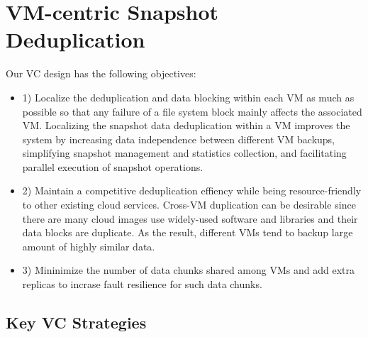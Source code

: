 \section{VM-centric Snapshot Deduplication}
\label{sect:dedupe}


Our VC design has the following objectives:
\begin{itemize}

\item
1) Localize the deduplication and data blocking within each VM as much as possible so 
that any failure of a file system block mainly affects the associated VM.
Localizing the snapshot data deduplication within a VM
improves the system by increasing data independence between different VM backups,
simplifying snapshot management and statistics collection,
and facilitating parallel execution of snapshot operations.
\item
2) Maintain a competitive deduplication effiency while being resource-friendly to other
existing cloud services.
Cross-VM duplication can be desirable since  there are many cloud images
use widely-used software and libraries and their data blocks are duplicate. 
As the result, different VMs tend to backup large amount of highly similar data.
\item
3)  Mininimize the number of data chunks shared among VMs and add extra replicas to incrase
fault resilience for such data chunks.
\end{itemize}

\subsection{Key VC Strategies}


